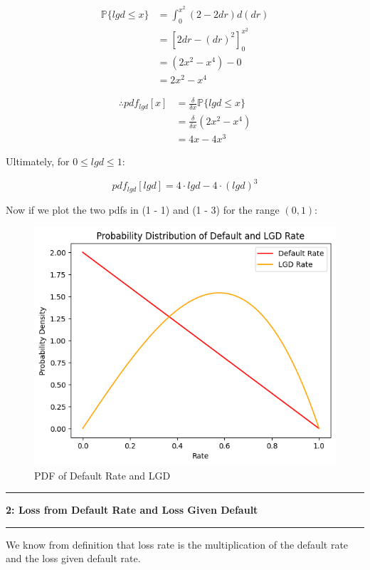 \documentclass[11pt]{article}
\newcommand\question[2]{\vspace{.25in}\hrule\textbf{#1: #2}\vspace{.5em}\hrule\vspace{.10in}}
\renewcommand{\P}{\mathbb{P}}
\begin{document}
$$
\begin{aligned}
\P\{lgd \leq x\} &=
\int_0^{x^2} (2 - 2dr) d(dr) \\
&= \left[ 
2dr - (dr)^2
\right]_0^{x^2} \\
&= (2x^2 - x^4) - 0 \\
&= 2x^2 - x^4
\end{aligned}
$$

$$
\begin{aligned}
\therefore
pdf_{lgd}[x] &= 
\frac{\delta}{\delta x} \P\{lgd \leq x\} \\
&= \frac{\delta}{\delta x} (2x^2 - x^4) \\
&= 4x - 4x^3 
\end{aligned}
$$

Ultimately, for $0 \leq lgd \leq 1$:

\begin{equation} \tag{1 - 3}
pdf_{lgd}[lgd] =
4 \cdot lgd - 4 \cdot (lgd)^3
\end{equation}

Now if we plot the two pdfs in (1 - 1) and (1 - 3) for the
range $(0, 1)$:

\begin{figure}[h]
\centering
\includegraphics[scale=0.8]{Q1.png}
\caption{PDF of Default Rate and LGD}
\label{Fig:Q1}
\end{figure}

\newpage

\question{2}{Loss from Default Rate and Loss Given Default}

We know from definition that loss rate is the multiplication of
the default rate and the loss given default rate.
\end{document}

